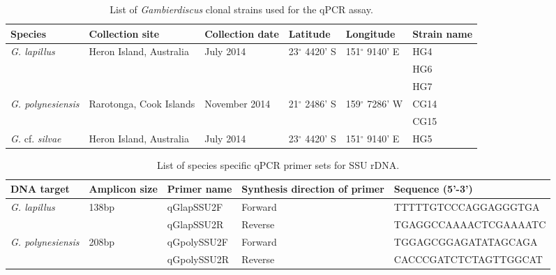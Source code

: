 \documentclass[12pt]{article}
\begin{document}
\FloatBarrier
\begin{table}
\caption{List of \emph{Gambierdiscus} clonal strains used for the qPCR assay.}
\label{tbl:StrainTable}
\begin{tabular}{ | p{2cm} | p{2cm} | p{2cm}| p{3cm} | p{3cm} | p{2cm} | }
\hline
\textbf{Species} & \textbf{Collection site} & \textbf{Collection date} &\textbf{Latitude} & \textbf{Longitude} & \textbf{Strain name} \\
\hline
\emph{G. lapillus} &Heron Island, Australia &July 2014 &23$^{\circ}$ 4420' S&151$^{\circ}$ 9140' E & HG4 \\
\hline
&&&&& HG6\\
\hline
&&&& &HG7\\
\hline
\emph{G. polynesiensis}&Rarotonga, Cook Islands&November 2014 &21$^{\circ}$ 2486' S&159$^{\circ}$ 7286' W & CG14 \\
\hline
&&&&&CG15\\
\hline
\emph{G.} cf. \emph{silvae}&Heron Island, Australia &July 2014 &23$^{\circ}$ 4420' S&151$^{\circ}$ 9140' E& HG5\\
\hline
\end{tabular}
\end{table}
\FloatBarrier
\begin{table}
\caption{List of species specific qPCR primer sets for SSU rDNA.}
\label{tbl:PrimerTable}
\begin{tabular}{ | p{2cm} | p{2cm} | p{2cm} | p{2cm} | p{7cm} | }
\hline
\textbf{DNA target} & \textbf{Amplicon size} & \textbf{Primer name} & \textbf{Synthesis direction of primer} & \textbf{Sequence (5'-3')} \\
\hline
\emph{G. lapillus}&138bp&qGlapSSU2F&Forward&TTTTTGTCCCAGGAGGGTGA\\
\hline
& &qGlapSSU2R&Reverse&TGAGGCCAAAACTCGAAAATC\\
\hline
\emph{G. polynesiensis}&208bp&qGpolySSU2F&Forward&TGGAGCGGAGATATAGCAGA\\
\hline
& &qGpolySSU2R&Reverse&CACCCGATCTCTAGTTGGCAT\\
\hline
\end{tabular}
\end{table}
\FloatBarrier
\end{document}
